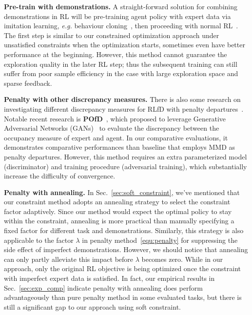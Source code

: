 \documentclass[letterpaper]{article} %
\begin{document}
\noindent
\textbf{Pre-train with demonstrations.} A straight-forward solution for combining demonstrations in RL will be pre-training agent policy with expert data via imitation learning, \emph{e.g.} behaviour cloning~\cite{lfd1,lfd2}, then proceeding with normal RL~\cite{pretrain1,pretrain2}. The first step is similar to our constrained optimization approach under unsatisfied constraints when the optimization starts, sometimes even have better performance at the beginning. However, this method cannot guarantee the exploration quality in the later RL step; thus the subsequent training can still suffer from poor sample efficiency in the case with large exploration space and sparse feedback.

\noindent
\textbf{Penalty with other discrepancy measures.} There is also some research on investigating different discrepancy measures for RLfD with penalty departures~\cite{ijcaipofd1,pofd}. Notable recent research is \textbf{POfD}~\cite{pofd}, which proposed to leverage Generative Adversarial Networks (GANs)~\cite{GAN} to evaluate the discrepancy between the occupancy measure of expert and agent. In our comparative evaluations, it demonstrates comparative performances than baseline that employs MMD as penalty departures. However, this method requires an extra parameterized model (discriminator) and training procedure (adversarial training), which substantially increase the difficulty of convergence.

\noindent
\textbf{Penalty with annealing.} In Sec.~\ref{sec:soft_constraint}, we've mentioned that our constraint method adopts an annealing strategy to select the constraint factor adaptively. Since our method would expect the optimal policy to stay within the constraint, annealing is more practical than manually specifying a fixed factor for different task and demonstrations. Similarly, this strategy is also applicable to the factor $\lambda$ in penalty method~\eqref{equ:penalty} for suppressing the side effect of imperfect demonstrations.
However, we should notice that annealing can only partly alleviate this impact before $\lambda$ becomes zero. While in our approach, only the original RL objective is being optimized once the constraint with imperfect expert data is satisfied. In fact, our empirical results in Sec.~\ref{sec:exp_comp} indicate penalty with annealing does perform advantageously than pure penalty method in some evaluated tasks, but there is still a significant gap to our approach using soft constraint.
\end{document}
